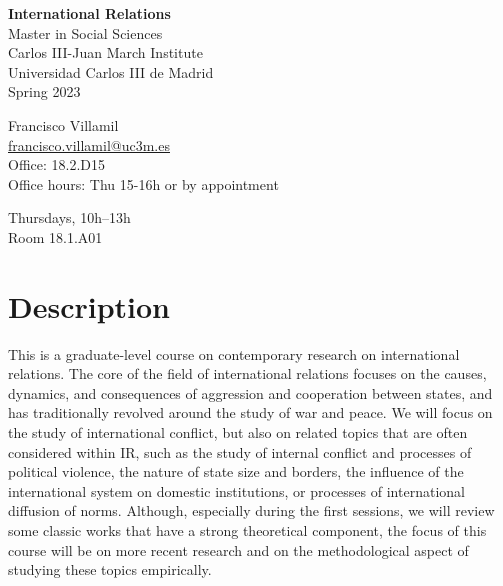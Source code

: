 \documentclass[12pt, a4paper]{article}
\begin{document}
\begin{center}
{\LARGE\bf International Relations}\\\vspace{10pt}
Master in Social Sciences\\
Carlos III-Juan March Institute\\Universidad Carlos III de Madrid\\\vspace{10pt}
{\large Spring 2023}\\
\end{center}

\vspace{20pt}

\begin{minipage}{0.49\textwidth}
Francisco Villamil\\
\href{francisco.villamil@uc3m.es}{francisco.villamil@uc3m.es}\\
Office: 18.2.D15\\Office hours: Thu 15-16h or by appointment\\
\end{minipage}\hfill
\begin{minipage}{0.49\textwidth}
\centering
Thursdays, 10h--13h\\Room 18.1.A01\\
\end{minipage}


\vspace{10pt}
\section{Description}

This is a graduate-level course on contemporary research on international relations. The core of the field of international relations focuses on the causes, dynamics, and consequences of aggression and cooperation between states, and has traditionally revolved around the study of war and peace.
We will focus on the study of international conflict, but also on related topics that are often considered within IR, such as the study of internal conflict and processes of political violence, the nature of state size and borders, the influence of the international system on domestic institutions, or processes of international diffusion of norms.
Although, especially during the first sessions, we will review some classic works that have a strong theoretical component, the focus of this course will be on more recent research and on the methodological aspect of studying these topics empirically.
\end{document}
